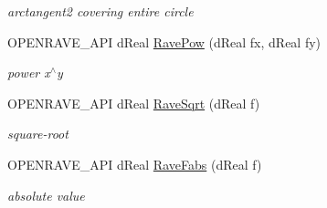 \begin{Indent}{\bf }
\begin{DoxyCompactItemize}
\begin{DoxyCompactList}\small\item\em arctangent2 covering entire circle \item\end{DoxyCompactList}\item 
\hypertarget{group__affine__math_ga793937be7953d32b65f2141199cd23d9}{
OPENRAVE\_\-API dReal \hyperlink{group__affine__math_ga793937be7953d32b65f2141199cd23d9}{RavePow} (dReal fx, dReal fy)}
\label{group__affine__math_ga793937be7953d32b65f2141199cd23d9}

\begin{DoxyCompactList}\small\item\em power x$^\wedge$y \item\end{DoxyCompactList}\item 
\hypertarget{group__affine__math_ga4fbefacd06b4565772517dae42e2cbcc}{
OPENRAVE\_\-API dReal \hyperlink{group__affine__math_ga4fbefacd06b4565772517dae42e2cbcc}{RaveSqrt} (dReal f)}
\label{group__affine__math_ga4fbefacd06b4565772517dae42e2cbcc}

\begin{DoxyCompactList}\small\item\em square-\/root \item\end{DoxyCompactList}\item 
\hypertarget{group__affine__math_ga3723ea5834c83fdbf64b9b9ad1d95cc6}{
OPENRAVE\_\-API dReal \hyperlink{group__affine__math_ga3723ea5834c83fdbf64b9b9ad1d95cc6}{RaveFabs} (dReal f)}
\label{group__affine__math_ga3723ea5834c83fdbf64b9b9ad1d95cc6}

\begin{DoxyCompactList}\small\item\em absolute value \item\end{DoxyCompactList}\end{DoxyCompactItemize}
\end{Indent}
